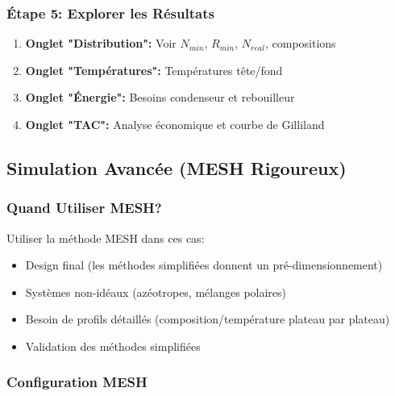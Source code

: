 \documentclass[11pt,a4paper]{article}
\begin{document}
\subsubsection{Étape 5: Explorer les Résultats}

\begin{enumerate}[leftmargin=*]
    \item \textbf{Onglet "Distribution":} Voir $N_{min}$, $R_{min}$, $N_{real}$, compositions
    \item \textbf{Onglet "Températures":} Températures tête/fond
    \item \textbf{Onglet "Énergie":} Besoins condenseur et rebouilleur
    \item \textbf{Onglet "TAC":} Analyse économique et courbe de Gilliland
\end{enumerate}

\subsection{Simulation Avancée (MESH Rigoureux)}

\subsubsection{Quand Utiliser MESH?}

Utiliser la méthode MESH dans ces cas:

\begin{itemize}[leftmargin=*]
    \item Design final (les méthodes simplifiées donnent un pré-dimensionnement)
    \item Systèmes non-idéaux (azéotropes, mélanges polaires)
    \item Besoin de profils détaillés (composition/température plateau par plateau)
    \item Validation des méthodes simplifiées
\end{itemize}

\subsubsection{Configuration MESH}
\end{document}
